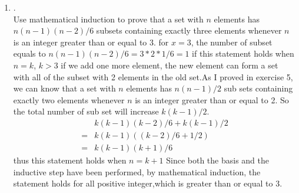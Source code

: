 \documentclass{article}
\theoremstyle{definition}
\theoremstyle{plain}
\begin{document}
\begin {enumerate}[itemindent=30pt,label=\bf Exercise {\arabic*}:]
\item .\\
Use mathematical induction to prove that a set with $n$ elements has $n(n-1)(n-2)/6$ subsets containing exactly three elements whenever $n$ is an integer greater than or equal to 3.
\subitem for $x = 3$, the number of subset equals to $n(n-1)(n-2)/6 = 3*2*1/6 = 1$
\subitem if this statement holds when $n = k$, $k > 3$
\subitem if we add one more element, the new element can form a set with all of the subset with 2 elements in the old set.As I proved in exercise 5, we can know that a set with $n$ elements has $n(n-1)/2$ sub sets containing exactly two elements whenever $n$ is an integer greater than or equal to 2. So the total number of sub set will increase $k(k-1)/2$.  
\begin{align*}
	&k(k-1)(k-2)/6 +  k(k-1)/2 \\
	=&k(k-1)((k-2)/6 + 1/2) \\
	=&k(k-1)(k+1)/6
\end{align*}
\subitem thus this statement holds when $n = k+1$
\subitem Since both the basis and the inductive step have been performed, by mathematical induction, the statement holds for all positive integer,which is greater than or equal to 3.
\end{enumerate}
\end{document}
